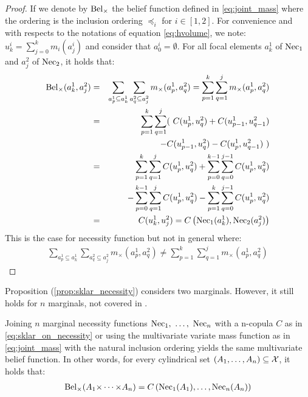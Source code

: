 \begin{proof}
    If we denote by ${\mathrm{Bel}}_\times$ the belief function defined in \eqref{eq:joint_mass} where the ordering is the inclusion ordering $\preceq_i$ for $i\in[1,2]$. For convenience and with respects to the notations of equation \eqref{eq:hvolume}, we note: $u^i_k=\sum_{j=0}^{k}m_i(a_j^i)$ and consider that $a^i_0=\emptyset$.
    For all focal elements $a_k^1$ of ${\mathrm{Nec}}_1$ and $a^2_j$ of ${\mathrm{Nec}}_2$, it holds that:
    \begin{eqnarray*}
        {\mathrm{Bel}}_\times(a^1_k, a^2_j) &=& \sum_{a^1_p\subseteq a_k^1}\sum_{a^2_q\subseteq a_j^2}m_\times(a^1_p, a^2_q) = \sum_{p=1}^k\sum_{q=1}^j m_\times(a^1_p, a^2_q)\\
        &=&\sum_{p=1}^k\sum_{q=1}^j (~C(u^1_p, u^2_q) + C(u^1_{p-1}, u^2_{q-1}) \\
        &&- C(u^1_{p-1}, u^2_{q}) - C(u^1_{p}, u^2_{q-1})~)\\
        &=&\sum_{p=1}^k\sum_{q=1}^jC(u^1_p, u^2_q) + \sum_{p=0}^{k-1}\sum_{q=0}^{j-1}C(u^1_p, u^2_q) \\
        &&- \sum_{p=0}^{k-1}\sum_{q=1}^jC(u^1_p, u^2_q) - \sum_{p=1}^k\sum_{q=0}^{j-1}C(u^1_p, u^2_q)\\
        &=& C(u^1_k, u^2_j) = C\left({\mathrm{Nec}}_1(a_k^1), {\mathrm{Nec}}_2(a_j^2)\right)\\
    \end{eqnarray*}
    This is the case for necessity function but not in general where:
    \begin{align*}
        \sum_{a^1_p\subseteq a_k^1}\sum_{a^2_q\subseteq a_j^2}m_\times(a^1_p, a^2_q) \neq \sum_{p=1}^k\sum_{q=1}^j m_\times(a^1_p, a^2_q)
    \end{align*}
\end{proof}

Proposition (\ref{prop:sklar_necessity}) considers two marginals. However, it still holds for $n$ marginals, not covered in \cite{schmelzer_sklars_2015}.
\begin{proposition}
   Joining $n$ marginal necessity functions ${\mathrm{Nec}}_1,~\dots,~{\mathrm{Nec}}_n$ with a n-copula $C$ as in \eqref{eq:sklar_on_necessity} or using the multivariate variate mass function as in \eqref{eq:joint_mass} with the natural inclusion ordering yields the same multivariate belief function. In other words, for every cylindrical set $(A_1, \dots, A_n)\subseteq{\mathcal{X}}$, it holds that:
\begin{eqnarray}
    {\mathrm{Bel}}_\times(A_1{\times\dots\times} A_n) = C\left({\mathrm{Nec}}_1(A_1), \dots, {\mathrm{Nec}}_n(A_n)\right)
\end{eqnarray}
\end{proposition}

